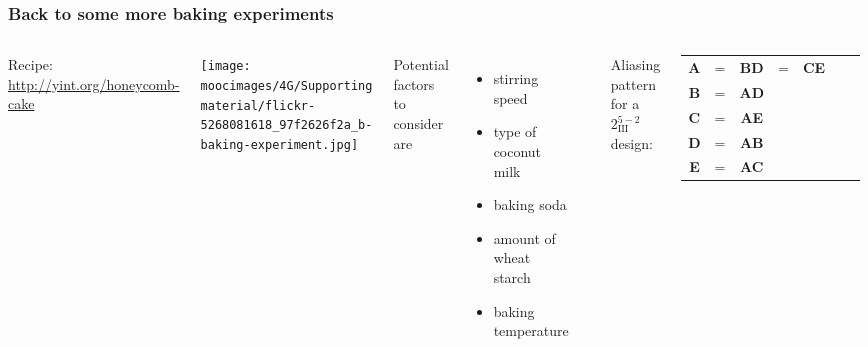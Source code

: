\documentclass[handout,11pt,aspectratio=169,mathserif]{beamer}
\begin{document}
\begin{frame}\frametitle{Back to some more baking experiments}
	\begin{columns}[T]
		
			\vspace{1cm}
			{\small Recipe: \href{http://yint.org/honeycomb-cake}{http://yint.org/honeycomb-cake}}
		
			\vspace{1cm}
		
			\centerline{\texttt{[image: \\moocimages/4G/Supporting material/flickr-5268081618\_97f2626f2a\_b-baking-experiment.jpg]}}
			
		
			Potential factors to consider are
			\begin{itemize}
				\item	stirring speed
				\item	type of coconut milk
				\item	baking soda
				\item	amount of wheat starch
				\item	baking temperature
			\end{itemize}
			
			\vspace{0.4cm}
			\hrule
			
			\vspace{0.1cm}
			Aliasing pattern for a $2^{5-2}_{\textrm{III}}$ design:
			\begin{tabulary}{\linewidth}{ccccccc}				
				\textbf{A} & = & \textbf{BD} & = & \textbf{CE}  \\
				\textbf{B} & = & \textbf{AD} & & \\
				\textbf{C} & = & \textbf{AE} & & \\
				\textbf{D} & = & \textbf{AB} & & \\
				\textbf{E} & = & \textbf{AC} & & 
			\end{tabulary}
			
	\end{columns}
	
	\vspace{1cm}

	
\end{frame}
\end{document}
